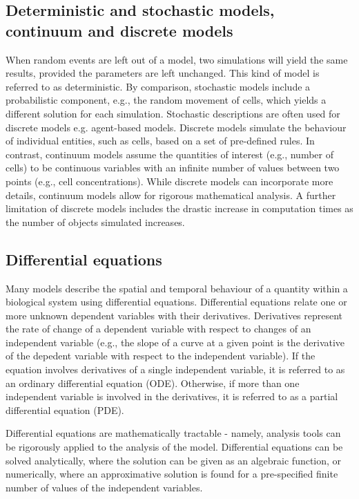 \documentclass{article}
\begin{document}
\subsection{Deterministic and stochastic models, continuum and discrete models}

When random events are left out of a model, two simulations will yield the same results, provided the parameters are left unchanged.
This kind of model is referred to as deterministic.
By comparison, stochastic models include a probabilistic component, e.g., the random movement of cells, which yields a different solution for each simulation.
Stochastic descriptions are often used for discrete models e.g. agent-based models.
Discrete models simulate the behaviour of individual entities, such as cells, based on a set of pre-defined rules.
In contrast, continuum models assume the quantities of interest (e.g., number of cells) to be continuous variables with an infinite number of values between two points (e.g., cell concentrations).
While discrete models can incorporate more details, continuum models allow for rigorous mathematical analysis.
A further limitation of discrete models includes the drastic increase in computation times as the number of objects simulated increases.

\subsection{Differential equations}

Many models describe the spatial and temporal behaviour of a quantity within a biological system using differential equations.
Differential equations relate one or more unknown dependent variables with their derivatives. 
Derivatives represent the rate of change of a dependent variable with respect to changes of an independent variable (e.g., the slope of a curve at a given point is the derivative of the depedent variable with respect to the independent variable).
If the equation involves derivatives of a single independent variable, it is referred to as an ordinary differential equation (ODE).
Otherwise, if more than one independent variable is involved in the derivatives, it is referred to as a partial differential equation (PDE).

Differential equations are mathematically tractable - namely, analysis tools can be rigorously applied to the analysis of the model.
Differential equations can be solved analytically, where the solution can be given as an algebraic function, or numerically, where an approximative solution is found for a pre-specified finite number of values of the independent variables.
\end{document}
